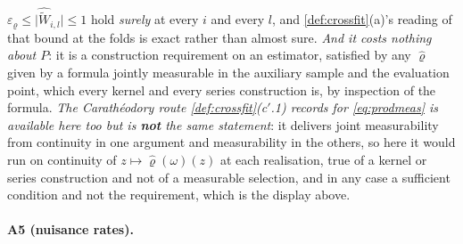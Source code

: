 $\varepsilon_\varrho\le\big|\widehat{\widetilde W}_{i,l}\big|\le1$ hold \emph{surely} at every $i$ and
every $l$, and
\cref{def:crossfit}\textup{(a)}'s reading of that bound at the folds is exact rather than almost sure.
\emph{And it costs nothing about $P$}: it is a construction requirement on an estimator, satisfied by any
$\hat\varrho$ given by a formula jointly measurable in the auxiliary sample and the evaluation point, 
which every kernel and every series construction is, by inspection of the formula. \emph{The
Carath\'eodory route \cref{def:crossfit}\textup{(c$'$.1)} records for \eqref{eq:prodmeas} is available
here too but is \textbf{not} the same statement}: it delivers joint measurability from continuity in one
argument and measurability in the others, so here it would run on continuity of
$z\mapsto\hat\varrho(\omega)(z)$ at each realisation, true of a kernel or series construction and not
of a measurable selection, and in any case a sufficient condition and not the requirement, which is the
display above.

\paragraph{A5 (nuisance rates).}

